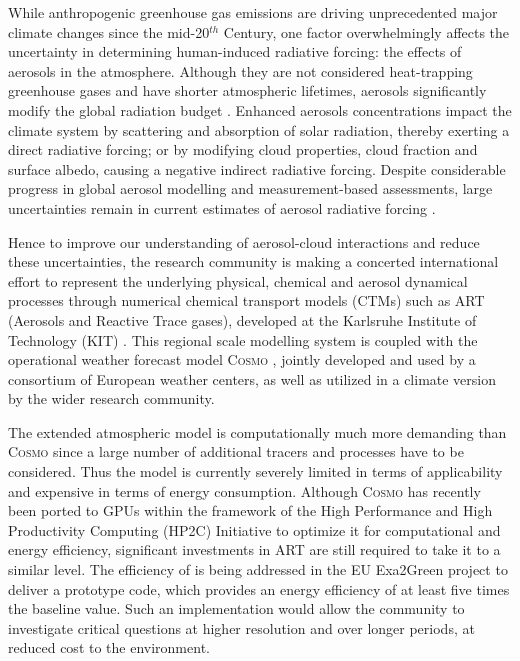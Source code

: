 While anthropogenic greenhouse gas emissions are driving unprecedented
major  climate  changes  since   the  mid-20$^{th}$  Century,  one  factor
overwhelmingly  affects  the  uncertainty  in  determining  human-induced
radiative  forcing:  the  effects   of  aerosols  in  the  atmosphere.
Although they  are not considered  heat-trapping greenhouse  gases and
have  shorter  atmospheric lifetimes,  aerosols  significantly modify  the
global   radiation   budget   \cite{IPCC-2013}.   Enhanced   aerosols
concentrations impact the climate  system by scattering and absorption
of solar radiation, thereby exerting a direct radiative forcing; or by
modifying cloud  properties,  cloud  fraction and  surface
albedo,  causing  a  negative  indirect  radiative  forcing.   Despite
considerable  progress in  global aerosol  modelling \cite{Mann-2013}
and  measurement-based  assessments,  large  uncertainties  remain  in
current  estimates  of  aerosol radiative  forcing  \cite{Myhre-2013,
IPCC-2013, Lee-2013,  Sherwood-2013,  Stier-2013}.

Hence to  improve our understanding of  aerosol-cloud interactions and
reduce  these  uncertainties,  the  research  community  is  making  a
concerted international  effort to represent  the underlying physical,
chemical  and aerosol dynamical  processes through  numerical chemical
transport  models (CTMs)  such  as ART  (Aerosols  and Reactive  Trace
gases),   developed   at  the   Karlsruhe   Institute  of   Technology
(KIT)  \cite{Vogel-2009,  Bangert-2011,  Knote-2013}.  This  regional
scale modelling system is coupled  with the operational  weather forecast
model  \textsc{Cosmo}  \cite{Baldauf-2011},  jointly developed and used by  a
consortium of European weather centers, as well as utilized in a climate version
by the wider research community.

The extended  atmospheric model \cosmoart  is com\-put\-ationally
much  more  demanding than  \textsc{Cosmo}  since  a  large number  of
additional  tracers and  processes have  to be  considered.   Thus the
model  is currently  severely limited  in terms  of applicability  and
expensive in terms of energy consumption.  Although \textsc{Cosmo} has
recently been ported to GPUs \cite{Gysi-2014, Lapillonne-2014} 
within
the framework of the  High Performance and High Productivity Computing
(HP2C) Initiative  \cite{HP2C} to optimize it  for computational and
energy efficiency,  significant investments in ART  are still required
to take it  to a similar level.  The  efficiency of \cosmoart
is being  addressed in the  EU Exa2Green project  \cite{EXA2GREEN} to
deliver a  prototype code, which  provides an energy efficiency  of at
least five times the  baseline value.  Such an implementation would
allow  the  community  to  investigate critical  questions  at  higher
resolution  and   over  longer  periods,   at  reduced  cost   to  the
environment.

